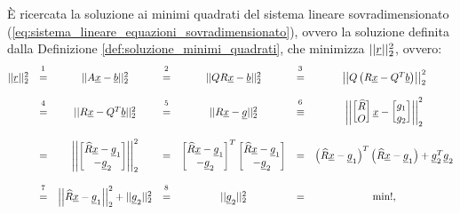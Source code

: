 È ricercata la soluzione ai minimi quadrati del sistema lineare sovradimensionato (\ref{eq:sistema_lineare_equazioni_sovradimensionato}), ovvero la soluzione definita dalla Definizione \ref{def:soluzione_minimi_quadrati}, che minimizza $ ||\uline r||_2^2$, ovvero:
\begin{equation}\label{eq:norma_2_residuo_minimo}
    \begin{matrix}
        ||\uline r||_2^2 &\overset{\footnotemark}{=}& ||A\uline x-\uline b||_2^2 &\overset{\footnotemark}{=}&||QR\uline x-\uline b||_2^2 &\overset{\footnotemark}{=}& \left|\left|Q\left(R\uline x-Q^T\uline b\right)\right|\right|_2^2\\\\
        &\overset{\footnotemark}{=}& ||R\uline x-Q^T\uline b||_2^2 &\overset{\footnotemark}{=}& ||R\uline x - \uline g||_2^2 &\overset{\footnotemark}{\equiv}& 
        \left|\left|\begin{bmatrix}
            \widehat R\\
            O
        \end{bmatrix}\uline x - 
        \begin{bmatrix}
            g_1\\
            g_2
        \end{bmatrix}\right|\right|_2^2\\\\
        &=& \left|\left|\begin{bmatrix}
            \widehat R\uline x-\uline g_1\\
            -\uline g_2
        \end{bmatrix}\right|\right|_2^2 &=&
        \begin{bmatrix}
            \widehat R\uline x-\uline g_1\\
            -\uline g_2
        \end{bmatrix}^T
        \begin{bmatrix}
            \widehat R\uline x-\uline g_1\\
            -\uline g_2
        \end{bmatrix}&=& \left(\widehat R\uline x-\uline g_1\right)^T\left(\widehat R\uline x-\uline g_1\right)+\uline g_2^T\uline g_2 \\\\
        &\overset{\footnotemark}{=}& \left|\left|\widehat R\uline x - \uline g_1\right|\right|_2^2+||\uline g_2||_2^2 &\overset{\footnotemark}{=}& ||\uline g_2||_2^2&=&\min !,
    \end{matrix}
\end{equation}

